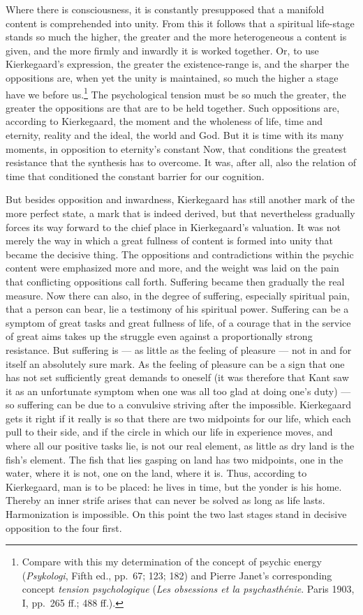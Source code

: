 \documentclass[12pt,a4paper]{book}
\newcommand{\opage}[1]{\marginnote{\footnotesize\textit{[#1]}}}
\begin{document}
Where there is consciousness, it is constantly presupposed that a manifold content is comprehended
into unity. From this it follows that a spiritual life-stage stands so much the higher, the greater
and the more heterogeneous a content is given, and the more firmly and inwardly it is worked
together. Or, to use Kierkegaard's expression, the greater the existence-range is, and the sharper
the oppositions are, when yet the unity is maintained, so much the higher a stage have we before
us.\footnote{Compare with this my determination of the concept of psychic energy (\emph{Psykologi},
Fifth ed., pp.~67; 123; 182) and Pierre Janet's corresponding concept \emph{tension psychologique}
(\emph{Les obsessions et la psychasthénie}. Paris 1903, I, pp.~265 ff.; 488 ff.).} The
psychological tension must be so much the greater, the greater the oppositions are that are to be
held together. Such oppositions are, according to Kierkegaard, the moment and the wholeness of
life, time and eternity, reality and the ideal, the world and God. But it is time with its many
moments, in opposition to eternity's constant Now, that conditions the greatest resistance that
the synthesis has to overcome. It was, after all, also the relation of time that conditioned the
constant barrier for our cognition.

But besides opposition and inwardness, Kierkegaard has still another mark of the more perfect
state, a mark that is indeed derived, but that nevertheless gradually forces its way forward to
the chief place in Kierkegaard's valuation. It was not merely the way in which a great fullness of
content is formed into unity that became the decisive thing. The oppositions and contradictions
within the psychic content were emphasized more and more, and the weight was laid on the pain that
conflicting oppositions call forth. Suffering became then \opage{166}gradually the real measure. Now there can
also, in the degree of suffering, especially spiritual pain, that a person can bear, lie a
testimony of his spiritual power. Suffering can be a symptom of great tasks and great fullness of
life, of a courage that in the service of great aims takes up the struggle even against a
proportionally strong resistance. But suffering is --- as little as the feeling of pleasure ---
not in and for itself an absolutely sure mark. As the feeling of pleasure can be a sign that one
has not set sufficiently great demands to oneself (it was therefore that Kant saw it as an
unfortunate symptom when one was all too glad at doing one's duty) --- so suffering can be due to
a convulsive striving after the impossible. Kierkegaard gets it right if it really is so that
there are two midpoints for our life, which each pull to their side, and if the circle in which
our life in experience moves, and where all our positive tasks lie, is not our real element, as
little as dry land is the fish's element. The fish that lies gasping on land has two midpoints,
one in the water, where it is not, one on the land, where it is. Thus, according to Kierkegaard,
man is to be placed: he lives in time, but the yonder is his home. Thereby an inner strife arises
that can never be solved as long as life lasts. Harmonization is impossible. On this point the two
last stages stand in decisive opposition to the four first.
\end{document}
